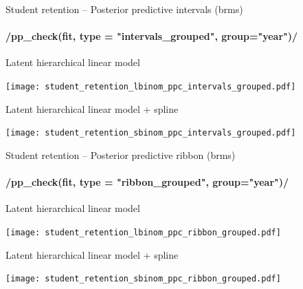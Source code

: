 \documentclass[t]{beamer}
\begin{document}
\begin{frame}[fragile]{Student retention -- Posterior predictive intervals (brms)}
\framesubtitle{\rinline/pp_check(fit, type = "intervals_grouped", group="year")/}

\vspace{-0.8\baselineskip}  
Latent hierarchical linear model\\  
  \hspace{-7mm}
  \begin{minipage}[t][3.6cm][t]{1.0\linewidth}
    \texttt{[image: student\_retention\_lbinom\_ppc\_intervals\_grouped.pdf]}
  \end{minipage}
  
\vspace{-0.5\baselineskip}  
Latent hierarchical linear model + spline\\  
  \hspace{-7mm}
  \begin{minipage}[t][3.6cm][t]{1.0\linewidth}
    \texttt{[image: student\_retention\_sbinom\_ppc\_intervals\_grouped.pdf]}
  \end{minipage}  

\end{frame}

\begin{frame}[fragile]{Student retention -- Posterior predictive ribbon (brms)}
\framesubtitle{\rinline/pp_check(fit, type = "ribbon_grouped", group="year")/}

\vspace{-0.8\baselineskip}  
Latent hierarchical linear model\\  
  \hspace{-7mm}
  \begin{minipage}[t][3.6cm][t]{1.0\linewidth}
    \texttt{[image: student\_retention\_lbinom\_ppc\_ribbon\_grouped.pdf]}
  \end{minipage}
  
\vspace{-0.5\baselineskip}  
Latent hierarchical linear model + spline\\  
  \hspace{-7mm}
  \begin{minipage}[t][3.6cm][t]{1.0\linewidth}
    \texttt{[image: student\_retention\_sbinom\_ppc\_ribbon\_grouped.pdf]}
  \end{minipage}  

\end{frame}

\end{document}
